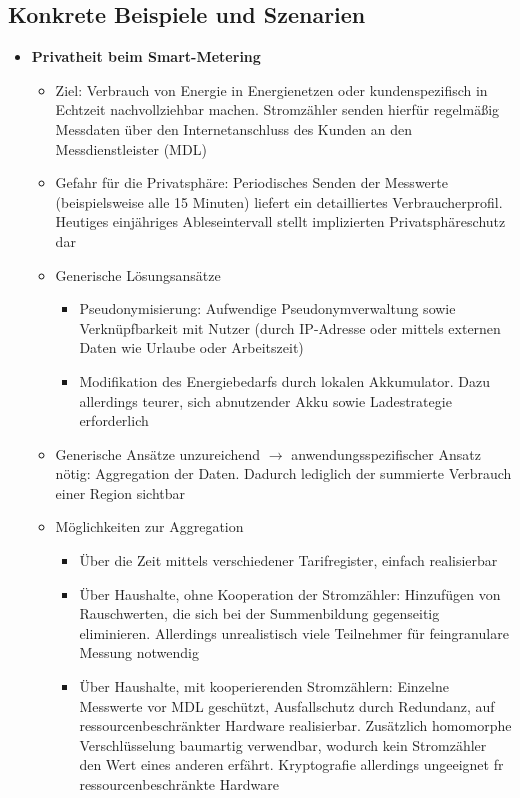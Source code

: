 \subsection{Konkrete Beispiele und Szenarien}
\begin{itemize}
	\item \textbf{Privatheit beim Smart-Metering}
	\begin{itemize}
		\item Ziel: Verbrauch von Energie in Energienetzen oder kundenspezifisch in Echtzeit nachvollziehbar machen. Stromzähler senden hierfür regelmäßig Messdaten über den Internetanschluss des Kunden an den Messdienstleister (MDL)
		\item Gefahr für die Privatsphäre: Periodisches Senden der Messwerte (beispielsweise alle 15 Minuten) liefert ein detailliertes Verbraucherprofil. Heutiges einjähriges Ableseintervall stellt implizierten Privatsphäreschutz dar
		\item Generische Lösungsansätze
		\begin{itemize}
			\item Pseudonymisierung: Aufwendige Pseudonymverwaltung sowie Verknüpfbarkeit mit Nutzer (durch IP-Adresse oder mittels externen Daten wie Urlaube oder Arbeitszeit)
			\item Modifikation des Energiebedarfs durch lokalen Akkumulator. Dazu allerdings teurer, sich abnutzender Akku sowie Ladestrategie erforderlich
		\end{itemize}
		\item Generische Ansätze unzureichend \(\rightarrow\) anwendungsspezifischer Ansatz nötig: Aggregation der Daten. Dadurch lediglich der summierte Verbrauch einer Region sichtbar
		\item Möglichkeiten zur Aggregation
		\begin{itemize}
			\item Über die Zeit mittels verschiedener Tarifregister, einfach realisierbar
			\item Über Haushalte, ohne Kooperation der Stromzähler: Hinzufügen von Rauschwerten, die sich bei der Summenbildung gegenseitig eliminieren. Allerdings unrealistisch viele Teilnehmer für feingranulare Messung notwendig
			\item Über Haushalte, mit kooperierenden Stromzählern: Einzelne Messwerte vor MDL geschützt, Ausfallschutz durch Redundanz, auf ressourcenbeschränkter Hardware realisierbar. Zusätzlich homomorphe Verschlüsselung baumartig verwendbar, wodurch kein Stromzähler den Wert eines anderen erfährt. Kryptografie allerdings ungeeignet fr ressourcenbeschränkte Hardware

\end{itemize}
\end{itemize}
\end{itemize}
